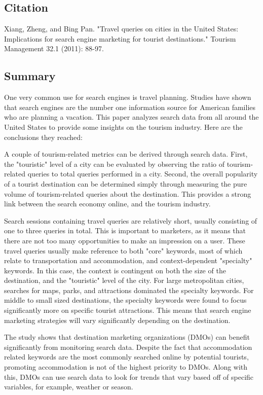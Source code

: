 \documentclass[../summaries.tex]{subfiles}
\begin{document}
\subsection{Citation}
Xiang, Zheng, and Bing Pan. "Travel queries on cities in the United States: Implications for search engine marketing for tourist destinations." Tourism Management 32.1 (2011): 88-97.

\subsection{Summary}
One very common use for search engines is travel planning. Studies have shown that search engines are the number one information source for American families who are planning a vacation. This paper analyzes search data from all around the United States to provide some insights on the tourism industry. Here are the conclusions they reached:

A couple of tourism-related metrics can be derived through search data. First, the "touristic" level of a city can be evaluated by observing the ratio of tourism-related queries to total queries performed in a city. Second, the overall popularity of a tourist destination can be determined simply through measuring the pure volume of tourism-related queries about the destination. This provides a strong link between the search economy online, and the tourism industry. 

Search sessions containing travel queries are relatively short, usually consisting of one to three queries in total. This is important to marketers, as it means that there are not too many opportunities to make an impression on a user. These travel queries usually make reference to both "core" keywords, most of which relate to transportation and accommodation, and context-dependent "specialty" keywords. In this case, the context is contingent on both the size of the destination, and the "touristic" level of the city. For large metropolitan cities, searches for maps, parks, and attractions dominated the specialty keywords. For middle to small sized destinations, the specialty keywords were found to focus significantly more on specific tourist attractions. This means that search engine marketing strategies will vary significantly depending on the destination.

The study shows that destination marketing organizations (DMOs) can benefit significantly from monitoring search data. Despite the fact that accommodation related keywords are the most commonly searched online by potential tourists, promoting accommodation is not of the highest priority to DMOs. Along with this, DMOs can use search data to look for trends that vary based off of specific variables, for example, weather or season.
\end{document}
